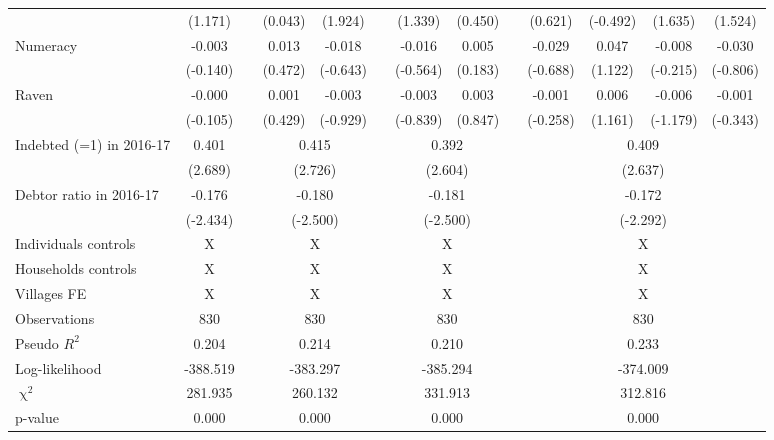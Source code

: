 \begin{table}[htbp]
{\begin{tabular}{lcccccccccccc}
          & (1.171) &       & (0.043) & (1.924) &       & (1.339) & (0.450) &       & (0.621) & (-0.492) & (1.635) & (1.524) \\
    Numeracy & -0.003 &       & 0.013 & -0.018 &       & -0.016 & 0.005 &       & -0.029 & 0.047 & -0.008 & -0.030 \\
          & (-0.140) &       & (0.472) & (-0.643) &       & (-0.564) & (0.183) &       & (-0.688) & (1.122) & (-0.215) & (-0.806) \\
    Raven & -0.000 &       & 0.001 & -0.003 &       & -0.003 & 0.003 &       & -0.001 & 0.006 & -0.006 & -0.001 \\
          & (-0.105) &       & (0.429) & (-0.929) &       & (-0.839) & (0.847) &       & (-0.258) & (1.161) & (-1.179) & (-0.343) \\
\cmidrule{1-2}\cmidrule{4-5}\cmidrule{7-8}\cmidrule{10-13}    Indebted (=1) in 2016-17 & 0.401 &       & \multicolumn{2}{c}{0.415} &       & \multicolumn{2}{c}{0.392} &       & \multicolumn{4}{c}{0.409} \\
          & (2.689) &       & \multicolumn{2}{c}{(2.726)} &       & \multicolumn{2}{c}{(2.604)} &       & \multicolumn{4}{c}{(2.637)} \\
    Debtor ratio in 2016-17 & -0.176 &       & \multicolumn{2}{c}{-0.180} &       & \multicolumn{2}{c}{-0.181} &       & \multicolumn{4}{c}{-0.172} \\
          & (-2.434) &       & \multicolumn{2}{c}{(-2.500)} &       & \multicolumn{2}{c}{(-2.500)} &       & \multicolumn{4}{c}{(-2.292)} \\
    Individuals controls & X     &       & \multicolumn{2}{c}{X} &       & \multicolumn{2}{c}{X} &       & \multicolumn{4}{c}{X} \\
    Households controls & X     &       & \multicolumn{2}{c}{X} &       & \multicolumn{2}{c}{X} &       & \multicolumn{4}{c}{X} \\
    Villages FE & X     &       & \multicolumn{2}{c}{X} &       & \multicolumn{2}{c}{X} &       & \multicolumn{4}{c}{X} \\
    \midrule
    Observations & 830   &       & \multicolumn{2}{c}{830} &       & \multicolumn{2}{c}{830} &       & \multicolumn{4}{c}{830} \\
    Pseudo $R^2$ & 0.204 &       & \multicolumn{2}{c}{0.214} &       & \multicolumn{2}{c}{0.210} &       & \multicolumn{4}{c}{0.233} \\
    Log-likelihood & -388.519 &       & \multicolumn{2}{c}{-383.297} &       & \multicolumn{2}{c}{-385.294} &       & \multicolumn{4}{c}{-374.009} \\
    $\upchi^2$ & 281.935 &       & \multicolumn{2}{c}{260.132} &       & \multicolumn{2}{c}{331.913} &       & \multicolumn{4}{c}{312.816} \\
    p-value & 0.000 &       & \multicolumn{2}{c}{0.000} &       & \multicolumn{2}{c}{0.000} &       & \multicolumn{4}{c}{0.000} \\
    \bottomrule

    \end{tabular}%
	}
  \label{}%
\end{table}%